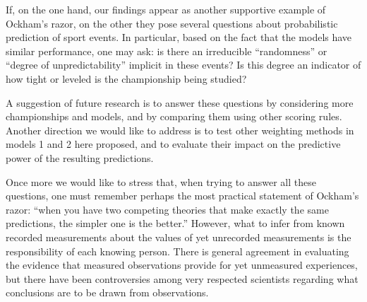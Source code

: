 \documentclass[journal,article,accept,moreauthors,pdftex,12pt,a4paper]{mdpi}
\begin{document}
		If, on the one hand, our findings appear as another supportive example of Ockham's razor, on the other they pose several questions about probabilistic prediction of sport events.
		In particular, based on the fact that the models have similar performance, one may ask: is there an irreducible ``randomness'' or ``degree of unpredictability'' implicit in these events?
		Is this degree an indicator of how tight or leveled is the championship being studied?
		
		A suggestion of future research is to answer these questions by considering more championships and models, and by comparing them using other scoring rules.
		Another direction we would like to address is to test other weighting methods in models 1 and 2 here
		proposed, and to evaluate their impact on the predictive power of the resulting predictions.
		
		Once more we would like to stress that, when trying to answer all these questions, one must remember perhaps the most practical statement of Ockham's razor: ``when you have two competing theories that make exactly the same predictions, the simpler one is the better.''
		However, what to infer from known recorded measurements about the values of yet unrecorded measurements is the responsibility of each knowing person.
		There is general agreement in evaluating the evidence that measured observations provide for yet unmeasured experiences, but there have been controversies among very respected scientists regarding what conclusions are to be drawn from observations.
		
		
		
		
		
		
		
		
		
		
		
		\makeatletter
		\renewcommand\@biblabel[1]{#1. }
		\makeatother
		
\end{document}
